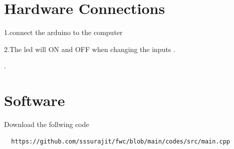 \documentclass[10pt, a4paper]{article}
\begin{document}
\section{Hardware Connections}
1.connect the arduino to the computer




  
2.The led will ON and OFF when changing the inputs .



.



\section{Software}
  Download the follwing code
  
 


 \begin{lstlisting}
  https://github.com/sssurajit/fwc/blob/main/codes/src/main.cpp
  \end{lstlisting}


       
  
\end{document}
